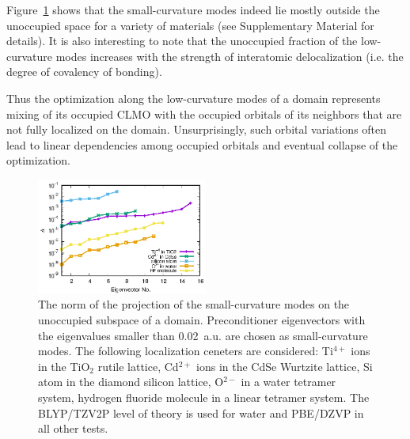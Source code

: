 \documentclass[aps,prl,twocolumn,reprint,amsmath,amssymb]{revtex4-1}
\begin{document}
Figure~\ref{fig:projection} shows that the small-curvature modes indeed lie mostly outside the unoccupied space for a variety of materials (see Supplementary Material for details). 
It is also interesting to note that the unoccupied fraction of the low-curvature modes increases with the strength of interatomic delocalization (i.e. the degree of covalency of bonding). 

Thus the optimization along the low-curvature modes of a domain represents mixing of its occupied CLMO with the occupied orbitals of its neighbors that are not fully localized on the domain. 
Unsurprisingly, such orbital variations often lead to linear dependencies among occupied orbitals and eventual collapse of the optimization. 

\begin{figure}
\centering
\includegraphics[width=0.5\textwidth]{residue}
\caption{
The norm of the projection of the small-curvature modes on the unoccupied subspace of a domain. 
Preconditioner eigenvectors with the eigenvalues smaller than 0.02~a.u. are chosen as small-curvature modes. 
The following localization ceneters are considered: Ti$^{4+}$ ions in the TiO$_2$ rutile lattice, Cd$^{2+}$ ions in the CdSe Wurtzite lattice, Si atom in the diamond silicon lattice, O$^{2-}$ in a water tetramer system, hydrogen fluoride molecule in a linear tetramer system. 
The BLYP/TZV2P level of theory is used for water and PBE/DZVP in all other tests.}
\label{fig:projection}
\end{figure}
\end{document}
